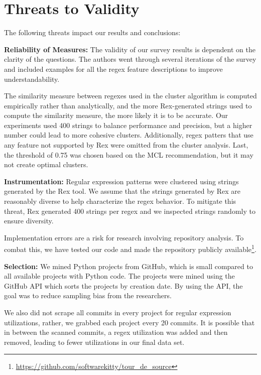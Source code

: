 \documentclass{sig-alternate-05-2015}
\newcommand{\todoMid}[1]{\textbf{\textcolor{magenta}{TODO.MID: #1}}} %
\begin{document}










\section{Threats to Validity}
\label{sec:threats}
The following threats impact our results and conclusions:

\textbf{Reliability of Measures:} The validity of our survey results is dependent on the clarity of the questions. The authors went through several iterations of the survey and included examples for all the regex feature descriptions to improve understandability.

The similarity measure between regexes used in the cluster algorithm is computed empirically rather than analytically, and the more Rex-generated strings used to compute the similarity measure, the more likely it is to be accurate. Our experiments used 400 strings to balance performance and precision, but a higher number could lead to more cohesive clusters. Additionally, regex patters that use any feature not supported by Rex were omitted from the cluster analysis. Last, the threshold of 0.75 was chosen based on the MCL recommendation, but it may not create optimal clusters. %

\textbf{Instrumentation:} Regular expression patterns were clustered using strings generated by the Rex tool.  We assume that the strings generated by Rex are reasonably diverse to help characterize the regex behavior. To mitigate this threat, Rex generated 400 strings per regex and we inspected strings randomly to ensure diversity.

Implementation errors are a risk for research involving repository analysis. To combat this, we have tested our code and made the repository publicly available\footnote{\url{https://github.com/softwarekitty/tour_de_source}}.

\textbf{Selection:} We mined  Python projects from GitHub, which is  small compared to all available projects with Python code. The projects were mined using the GitHub API which sorts the projects by creation date. By using the API, the goal was to reduce  sampling bias from the researchers.

We also did not scrape all commits in every project for regular expression utilizations, rather, we grabbed each project every 20 commits. It is possible that in between the scanned commits, a regex utilization was added and then removed, leading to fewer utilizations in our final data set.
\end{document}
